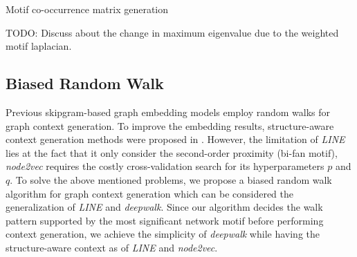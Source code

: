 \documentclass{article}
\theoremstyle{definition}
\begin{document}
\begin{algorithm}[h] \label{al:madj}
\caption{Motif co-occurrence matrix generation}
\end{algorithm}

TODO: Discuss about the change in maximum eigenvalue due to the weighted
motif laplacian.

\subsection{Biased Random Walk}

Previous skipgram-based graph embedding models employ random
walks for graph context generation. To improve the embedding results,
structure-aware context generation methods were proposed in \cite{line,node2vec}.
However, the limitation of \emph{LINE} lies at the fact that it only
consider the second-order proximity (bi-fan motif),  \emph{node2vec} requires
the costly cross-validation search for its hyperparameters $p$ and $q$.
To solve the above mentioned problems, we propose a biased random walk
algorithm for graph context generation which can be considered the 
generalization of \emph{LINE} and \emph{deepwalk}. Since our algorithm
decides the walk pattern supported by the most significant network motif before 
performing context generation, we achieve the simplicity of \emph{deepwalk}
while having the structure-aware context as of \emph{LINE} and \emph{node2vec}.
\end{document}
